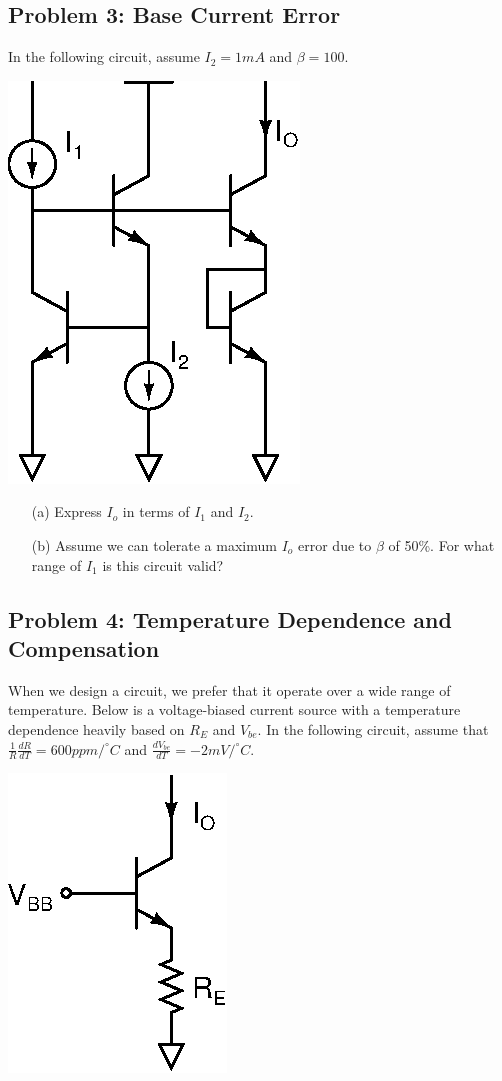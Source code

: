 \documentclass[11pt,twoside]{article}
\begin{document}
\clearpage

\subsection*{Problem 3: Base Current Error}
In the following circuit, assume $I_2=1mA$ and $\beta=100$.\\
\vspace{1ex}

\begin{center}
\includegraphics[width=.28\textwidth]{sqrtxy.eps}
\end{center}

\begin{enumerate}
	\item[(a)] Express $I_o$ in terms of $I_1$ and $I_2$.
	\item[(b)] Assume we can tolerate a maximum $I_o$ error due to $\beta$ of 50\%.  For what range of $I_1$ is this circuit valid?
\end{enumerate}

\subsection*{Problem 4: Temperature Dependence and Compensation}
When we design a circuit, we prefer that it operate over a wide range of temperature.
Below is a voltage-biased current source with a temperature dependence heavily based on $R_E$ and $V_{be}$.
In the following circuit, assume that $\frac{1}{R} \frac{dR}{dT}=600ppm/^{\circ}C$ and $\frac{dV_{be}}{dT}=-2mV/^{\circ}C$. \\
\vspace{1ex}

\begin{center}
\includegraphics[width=.25\textwidth]{temp-dep.eps}
\end{center}
\end{document}
